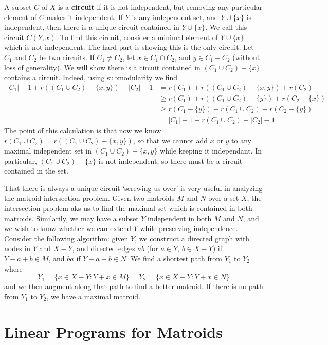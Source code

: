 A subset $C$ of $X$ is a {\bf circuit} if it is not independent, but removing any particular element of $C$ makes it independent. If $Y$ is any independent set, and $Y \cup \{ x \}$ is independent, then there is a unique circuit contained in $Y \cup \{ x \}$. We call this circuit $C(Y,x)$. To find this circuit, consider a minimal element of $Y \cup \{ x \}$ which is not independent. The hard part is showing this is the only circuit. Let $C_1$ and $C_2$ be two circuits. If $C_1 \neq C_2$, let $x \in C_1 \cap C_2$, and $y \in C_1 - C_2$ (without loss of generality). We will show there is a circuit contained in $(C_1 \cup C_2) - \{ x \}$ contains a circuit. Indeed, using submodularity we find
%
\begin{align*}
    |C_1| - 1 + r((C_1 \cup C_2) - \{ x, y \}) + |C_2| - 1 &= r(C_1) + r((C_1 \cup C_2) - \{ x, y \}) + r(C_2)\\
    &\geq r(C_1) + r((C_1 \cup C_2) - \{ y \} ) + r(C_2 - \{ x \})\\
    &\geq r(C_1 - \{ y \}) + r(C_1 \cup C_2) + r(C_2 - \{ y \})\\
    &= |C_1| - 1 + r(C_1 \cup C_2) + |C_2| - 1
\end{align*}
%
The point of this calculation is that now we know $r(C_1 \cup C_2) = r((C_1 \cup C_2) - \{ x, y \})$, so that we cannot add $x$ or $y$ to any maximal independent set in $(C_1 \cup C_2) - \{ x, y \}$ while keeping it independant. In particular, $(C_1 \cup C_2) - \{ x \}$ is not independent, so there must be a circuit contained in the set.

That there is always a unique circuit `screwing us over' is very useful in analyzing the matroid intersection problem. Given two matroids $M$ and $N$ over a set $X$, the intersection problem aks us to find the maximal set which is contained in both matroids. Similarily, we may have a subset $Y$ independent in both $M$ and $N$, and we wish to know whether we can extend $Y$ while preserving independence. Consider the following algorithm: given $Y$, we construct a directed graph with nodes in $Y$ and $X - Y$, and directed edges $ab$ (for $a \in Y$, $b \in X - Y$) if $Y - a + b \in M$, and $ba$ if $Y - a + b \in N$. We find a shortest path from $Y_1$ to $Y_2$ where
%
\[ Y_1 = \{ x \in X - Y : Y + x \in M \}\ \ \ \ \ \ Y_2 = \{ x \in X - Y: Y + x \in N \} \]
%
and we then augment along that path to find a better matroid. If there is no path from $Y_1$ to $Y_2$, we have a maximal matroid.

\section{Linear Programs for Matroids}


